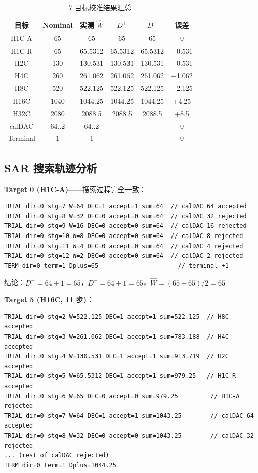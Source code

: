 \documentclass[12pt,a4paper]{article}
\begin{document}
\begin{table}[H]
\centering
\caption{7 目标校准结果汇总}
\label{tab:results}
\begin{tabular}{cccccc}
\toprule
目标 & Nominal & 实测 $\hat{W}$ & $D^+$ & $D^-$ & 误差 \\
\midrule
H1C-A & 65    & 65        & 65       & 65       & 0      \\
H1C-R & 65    & 65.5312   & 65.5312  & 65.5312  & +0.531 \\
H2C   & 130   & 130.531   & 130.531  & 130.531  & +0.531 \\
H4C   & 260   & 261.062   & 261.062  & 261.062  & +1.062 \\
H8C   & 520   & 522.125   & 522.125  & 522.125  & +2.125 \\
H16C  & 1040  & 1044.25   & 1044.25  & 1044.25  & +4.25  \\
H32C  & 2080  & 2088.5    & 2088.5   & 2088.5   & +8.5   \\
calDAC & 64..2 & 64..2     & ---      & ---      & 0      \\
Terminal & 1   & 1         & ---      & ---      & 0      \\
\bottomrule
\end{tabular}
\end{table}

\subsection{SAR 搜索轨迹分析}

\textbf{Target 0 (H1C-A)}——搜索过程完全一致：
\begin{lstlisting}[basicstyle=\tiny\ttfamily]
TRIAL dir=0 stg=7 W=64 DEC=1 accept=1 sum=64  // calDAC 64 accepted
TRIAL dir=0 stg=8 W=32 DEC=0 accept=0 sum=64  // calDAC 32 rejected
TRIAL dir=0 stg=9 W=16 DEC=0 accept=0 sum=64  // calDAC 16 rejected
TRIAL dir=0 stg=10 W=8 DEC=0 accept=0 sum=64  // calDAC 8 rejected
TRIAL dir=0 stg=11 W=4 DEC=0 accept=0 sum=64  // calDAC 4 rejected
TRIAL dir=0 stg=12 W=2 DEC=0 accept=0 sum=64  // calDAC 2 rejected
TERM dir=0 term=1 Dplus=65                      // terminal +1
\end{lstlisting}

结论：$D^+ = 64 + 1 = 65$，$D^- = 64 + 1 = 65$，$\hat{W} = (65 + 65)/2 = 65$ \checkmark

\textbf{Target 5 (H16C, 11 步)}：
\begin{lstlisting}[basicstyle=\tiny\ttfamily]
TRIAL dir=0 stg=2 W=522.125 DEC=1 accept=1 sum=522.125  // H8C accepted
TRIAL dir=0 stg=3 W=261.062 DEC=1 accept=1 sum=783.188  // H4C accepted
TRIAL dir=0 stg=4 W=130.531 DEC=1 accept=1 sum=913.719  // H2C accepted
TRIAL dir=0 stg=5 W=65.5312 DEC=1 accept=1 sum=979.25   // H1C-R accepted
TRIAL dir=0 stg=6 W=65 DEC=0 accept=0 sum=979.25         // H1C-A rejected
TRIAL dir=0 stg=7 W=64 DEC=1 accept=1 sum=1043.25        // calDAC 64 accepted
TRIAL dir=0 stg=8 W=32 DEC=0 accept=0 sum=1043.25        // calDAC 32 rejected
... (rest of calDAC rejected)
TERM dir=0 term=1 Dplus=1044.25
\end{lstlisting}
\end{document}
